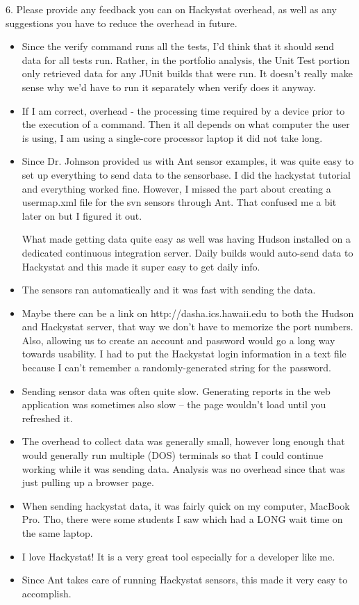 6. Please provide any feedback you can on Hackystat overhead, 
as well as any suggestions you have to reduce the overhead 
in future. 
\begin{itemize}
\item Since the verify command runs all the tests, I'd think that it should send data for all tests run.  Rather, in the portfolio analysis, the Unit Test portion only retrieved data for any JUnit builds that were run.  It doesn't really make sense why we'd have to run it separately when verify does it anyway.
\item If I am correct, overhead - the processing time required by a device prior to the execution of a command.  Then it all depends on what computer the user is using,  I am using a single-core processor laptop it did not take long.
\item Since Dr. Johnson provided us with Ant sensor examples, it was quite easy to set up everything to send data to the sensorbase. I did the hackystat tutorial and everything worked fine. However, I missed the part about creating a usermap.xml file for the svn sensors through Ant. That confused me a bit later on but I figured it out.

What made getting data quite easy as well was having Hudson installed on a dedicated continuous integration server. Daily builds would auto-send data to Hackystat and this made it super easy to get daily info.
\item The sensors ran automatically and it was fast with sending the data.
\item Maybe there can be a link on http://dasha.ics.hawaii.edu to both the Hudson and Hackystat server, that way we don't have to memorize the port numbers. Also, allowing us to create an account and password would go a long way towards usability. I had to put the Hackystat login information in a text file because I can't remember a randomly-generated string for the password.
\item Sending sensor data was often quite slow.  Generating reports in the web application was sometimes also slow -- the page wouldn't load until you refreshed it.
\item The overhead to collect data was generally small, however long enough that would generally run multiple (DOS) terminals so that I could continue working while it was sending data.  Analysis was no overhead since that was just pulling up a browser page.
\item When sending hackystat data, it was fairly quick on my computer, MacBook Pro. Tho, there were some students I saw which had a LONG wait time on the same laptop.
\item I love Hackystat! It is a very great tool especially for a developer like me.
\item Since Ant takes care of running Hackystat sensors, this made it very easy to accomplish. 
\end{itemize}

